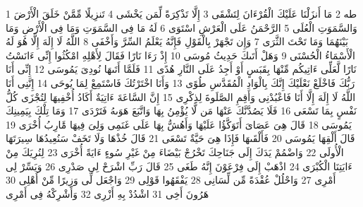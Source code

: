 \documentclass[20pt,a4paper]{article}
\title{}
\author{}
\date{}
\begin{document}
\pagecolor{cl_page}



{\tiny\colorbox{cl_aya}{1}} طه
{\tiny\colorbox{cl_aya}{2}} مَا أَنزَلْنَا عَلَيْكَ الْقُرْءَانَ لِتَشْقَى
{\tiny\colorbox{cl_aya}{3}} إِلَّا تَذْكِرَةً لِّمَن يَخْشَى
{\tiny\colorbox{cl_aya}{4}} تَنزِيلًا مِّمَّنْ خَلَقَ الْأَرْضَ وَالسَّمَوَتِ الْعُلَى
{\tiny\colorbox{cl_aya}{5}} الرَّحْمَنُ عَلَى الْعَرْشِ اسْتَوَى
{\tiny\colorbox{cl_aya}{6}} لَهُ مَا فِى السَّمَوَتِ وَمَا فِى الْأَرْضِ وَمَا بَيْنَهُمَا وَمَا تَحْتَ الثَّرَى
{\tiny\colorbox{cl_aya}{7}} وَإِن تَجْهَرْ بِالْقَوْلِ فَإِنَّهُ يَعْلَمُ السِّرَّ وَأَخْفَى
{\tiny\colorbox{cl_aya}{8}} اللَّهُ لَا إِلَهَ إِلَّا هُوَ لَهُ الْأَسْمَاءُ الْحُسْنَى
{\tiny\colorbox{cl_aya}{9}} وَهَلْ أَتَىكَ حَدِيثُ مُوسَى
{\tiny\colorbox{cl_aya}{10}} إِذْ رَءَا نَارًا فَقَالَ لِأَهْلِهِ امْكُثُوا إِنِّى ءَانَسْتُ نَارًا لَّعَلِّى ءَاتِيكُم مِّنْهَا بِقَبَسٍ أَوْ أَجِدُ عَلَى النَّارِ هُدًى
{\tiny\colorbox{cl_aya}{11}} فَلَمَّا أَتَىهَا نُودِىَ يَمُوسَى
{\tiny\colorbox{cl_aya}{12}} إِنِّى أَنَا رَبُّكَ فَاخْلَعْ نَعْلَيْكَ إِنَّكَ بِالْوَادِ الْمُقَدَّسِ طُوًى
{\tiny\colorbox{cl_aya}{13}} وَأَنَا اخْتَرْتُكَ فَاسْتَمِعْ لِمَا يُوحَى
{\tiny\colorbox{cl_aya}{14}} إِنَّنِى أَنَا اللَّهُ لَا إِلَهَ إِلَّا أَنَا فَاعْبُدْنِى وَأَقِمِ الصَّلَوةَ لِذِكْرِى
{\tiny\colorbox{cl_aya}{15}} إِنَّ السَّاعَةَ ءَاتِيَةٌ أَكَادُ أُخْفِيهَا لِتُجْزَى كُلُّ نَفْسٍ بِمَا تَسْعَى
{\tiny\colorbox{cl_aya}{16}} فَلَا يَصُدَّنَّكَ عَنْهَا مَن لَّا يُؤْمِنُ بِهَا وَاتَّبَعَ هَوَىهُ فَتَرْدَى
{\tiny\colorbox{cl_aya}{17}} وَمَا تِلْكَ بِيَمِينِكَ يَمُوسَى
{\tiny\colorbox{cl_aya}{18}} قَالَ هِىَ عَصَاىَ أَتَوَكَّؤُا عَلَيْهَا وَأَهُشُّ بِهَا عَلَى غَنَمِى وَلِىَ فِيهَا مََٔارِبُ أُخْرَى
{\tiny\colorbox{cl_aya}{19}} قَالَ أَلْقِهَا يَمُوسَى
{\tiny\colorbox{cl_aya}{20}} فَأَلْقَىهَا فَإِذَا هِىَ حَيَّةٌ تَسْعَى
{\tiny\colorbox{cl_aya}{21}} قَالَ خُذْهَا وَلَا تَخَفْ سَنُعِيدُهَا سِيرَتَهَا الْأُولَى
{\tiny\colorbox{cl_aya}{22}} وَاضْمُمْ يَدَكَ إِلَى جَنَاحِكَ تَخْرُجْ بَيْضَاءَ مِنْ غَيْرِ سُوءٍ ءَايَةً أُخْرَى
{\tiny\colorbox{cl_aya}{23}} لِنُرِيَكَ مِنْ ءَايَتِنَا الْكُبْرَى
{\tiny\colorbox{cl_aya}{24}} اذْهَبْ إِلَى فِرْعَوْنَ إِنَّهُ طَغَى
{\tiny\colorbox{cl_aya}{25}} قَالَ رَبِّ اشْرَحْ لِى صَدْرِى
{\tiny\colorbox{cl_aya}{26}} وَيَسِّرْ لِى أَمْرِى
{\tiny\colorbox{cl_aya}{27}} وَاحْلُلْ عُقْدَةً مِّن لِّسَانِى
{\tiny\colorbox{cl_aya}{28}} يَفْقَهُوا قَوْلِى
{\tiny\colorbox{cl_aya}{29}} وَاجْعَل لِّى وَزِيرًا مِّنْ أَهْلِى
{\tiny\colorbox{cl_aya}{30}} هَرُونَ أَخِى
{\tiny\colorbox{cl_aya}{31}} اشْدُدْ بِهِ أَزْرِى
{\tiny\colorbox{cl_aya}{32}} وَأَشْرِكْهُ فِى أَمْرِى
\end{document}
